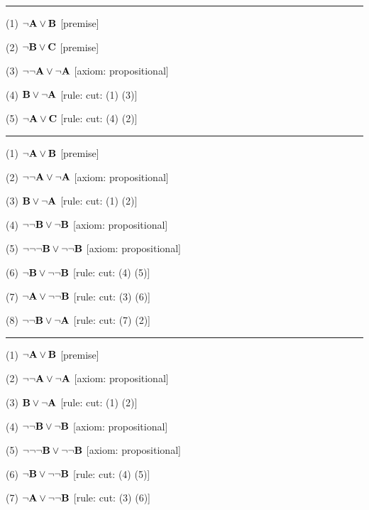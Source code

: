 \medskip
\hrule
\medskip
\item{(1)} $\neg {\bf A} \lor {\bf B}$ \hfill [premise]
\item{(2)} $\neg {\bf B} \lor {\bf C}$ \hfill [premise]
\item{(3)} $\neg \neg {\bf A} \lor \neg {\bf A}$ \hfill [axiom: propositional]
\item{(4)} ${\bf B} \lor \neg {\bf A}$ \hfill [rule: cut: (1) (3)]
\item{(5)} $\neg {\bf A} \lor {\bf C}$ \hfill [rule: cut: (4) (2)]
\medskip
\hrule
\medskip
\item{(1)} $\neg {\bf A} \lor {\bf B}$ \hfill [premise]
\item{(2)} $\neg \neg {\bf A} \lor \neg {\bf A}$ \hfill [axiom: propositional]
\item{(3)} ${\bf B} \lor \neg {\bf A}$ \hfill [rule: cut: (1) (2)]
\item{(4)} $\neg \neg {\bf B} \lor \neg {\bf B}$ \hfill [axiom: propositional]
\item{(5)} $\neg \neg \neg {\bf B} \lor \neg \neg {\bf B}$ \hfill [axiom: propositional]
\item{(6)} $\neg {\bf B} \lor \neg \neg {\bf B}$ \hfill [rule: cut: (4) (5)]
\item{(7)} $\neg {\bf A} \lor \neg \neg {\bf B}$ \hfill [rule: cut: (3) (6)]
\item{(8)} $\neg \neg {\bf B} \lor \neg {\bf A}$ \hfill [rule: cut: (7) (2)]
\medskip
\hrule
\medskip
\item{(1)} $\neg {\bf A} \lor {\bf B}$ \hfill [premise]
\item{(2)} $\neg \neg {\bf A} \lor \neg {\bf A}$ \hfill [axiom: propositional]
\item{(3)} ${\bf B} \lor \neg {\bf A}$ \hfill [rule: cut: (1) (2)]
\item{(4)} $\neg \neg {\bf B} \lor \neg {\bf B}$ \hfill [axiom: propositional]
\item{(5)} $\neg \neg \neg {\bf B} \lor \neg \neg {\bf B}$ \hfill [axiom: propositional]
\item{(6)} $\neg {\bf B} \lor \neg \neg {\bf B}$ \hfill [rule: cut: (4) (5)]
\item{(7)} $\neg {\bf A} \lor \neg \neg {\bf B}$ \hfill [rule: cut: (3) (6)]
